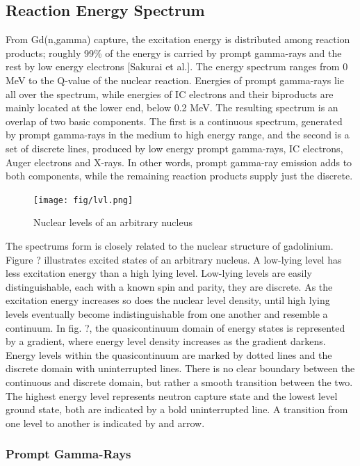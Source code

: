 \subsection{Reaction Energy Spectrum}
From Gd(n,gamma) capture, the excitation energy is distributed among reaction products; roughly 99\% of the energy is carried by prompt gamma-rays and the rest by low energy electrons [Sakurai et al.]. The energy spectrum ranges from 0 MeV to the Q-value of the nuclear reaction. Energies of prompt gamma-rays lie all over the spectrum, while energies of IC electrons and their biproducts are mainly located at the lower end, below 0.2 MeV.
The resulting spectrum is an overlap of two basic components. The first is a continuous spectrum, generated by prompt gamma-rays in the medium to high energy range, and the second is a set of discrete lines, produced by low energy prompt gamma-rays, IC electrons, Auger electrons and X-rays. In other words, prompt gamma-ray emission adds to both components, while the remaining reaction products supply just the discrete.

  \begin{figure}[h]
  \centering
  	\texttt{[image: fig/lvl.png]}
  	\caption{Nuclear levels of an arbitrary nucleus}
  	\label{fig:1}
  \end{figure}

The spectrums form is closely related to the nuclear structure of gadolinium. Figure ? illustrates excited states of an arbitrary nucleus. A low-lying level has less excitation energy than a high lying level. Low-lying levels are easily distinguishable, each with a known spin and parity, they are discrete. As the excitation energy increases so does the nuclear level density, until high lying levels eventually become indistinguishable from one another and resemble a continuum. In fig. ?, the quasicontinuum domain of energy states is represented by a gradient, where energy level density increases as the gradient darkens. Energy levels within the quasicontinuum are marked by dotted lines and the discrete domain with uninterrupted lines. There is no clear boundary between the continuous and discrete domain, but rather a smooth transition between the two. The highest energy level represents neutron capture state and the lowest level ground state, both are indicated by a bold uninterrupted line. A transition from one level to another is indicated by and arrow.

\subsubsection{Prompt Gamma-Rays}

